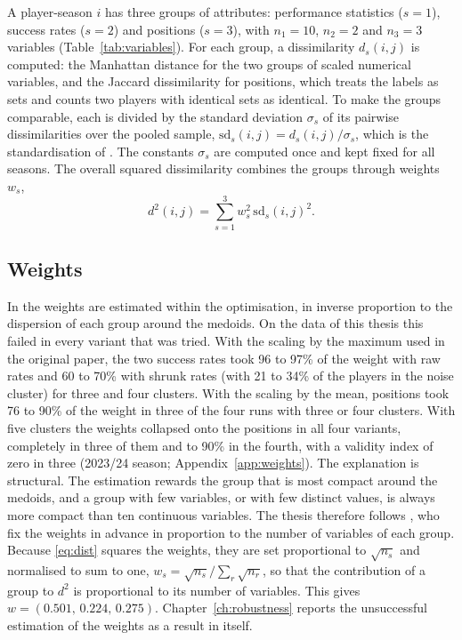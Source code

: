 A player-season $i$ has three groups of attributes: performance statistics ($s=1$), success rates ($s=2$) and positions ($s=3$), with $n_1=10$, $n_2=2$ and $n_3=3$ variables (Table~\ref{tab:variables}). For each group, a dissimilarity $d_s(i,j)$ is computed: the Manhattan distance for the two groups of scaled numerical variables, and the Jaccard dissimilarity for positions, which treats the labels as sets and counts two players with identical sets as identical. To make the groups comparable, each is divided by the standard deviation $\sigma_s$ of its pairwise dissimilarities over the pooled sample, $\mathrm{sd}_s(i,j)=d_s(i,j)/\sigma_s$, which is the standardisation of . The constants $\sigma_s$ are computed once and kept fixed for all seasons. The overall squared dissimilarity combines the groups through weights $w_s$,
\begin{equation}
	d^2(i,j)=\sum_{s=1}^{3} w_s^{2}\,\mathrm{sd}_s(i,j)^2 .
	\label{eq:dist}
\end{equation}

\subsection{Weights}

In  the weights are estimated within the optimisation, in inverse proportion to the dispersion of each group around the medoids. On the data of this thesis this failed in every variant that was tried. With the scaling by the maximum used in the original paper, the two success rates took 96 to 97\% of the weight with raw rates and 60 to 70\% with shrunk rates (with 21 to 34\% of the players in the noise cluster) for three and four clusters. With the scaling by the mean, positions took 76 to 90\% of the weight in three of the four runs with three or four clusters. With five clusters the weights collapsed onto the positions in all four variants, completely in three of them and to 90\% in the fourth, with a validity index of zero in three (2023/24 season; Appendix~\ref{app:weights}). The explanation is structural. The estimation rewards the group that is most compact around the medoids, and a group with few variables, or with few distinct values, is always more compact than ten continuous variables. The thesis therefore follows , who fix the weights in advance in proportion to the number of variables of each group. Because \eqref{eq:dist} squares the weights, they are set proportional to $\sqrt{n_s}$ and normalised to sum to one, $w_s=\sqrt{n_s}/\sum_r\sqrt{n_r}$, so that the contribution of a group to $d^2$ is proportional to its number of variables. This gives $w=(0.501,\,0.224,\,0.275)$. Chapter~\ref{ch:robustness} reports the unsuccessful estimation of the weights as a result in itself.

